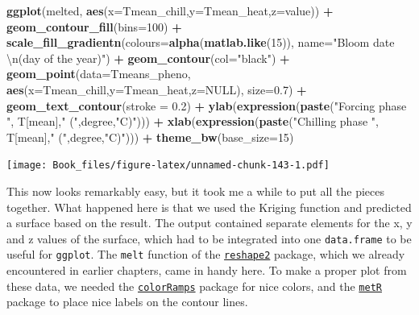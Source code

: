 \documentclass[
]{book}
\newenvironment{Shaded}{\begin{snugshade}}{\end{snugshade}}
\newcommand{\CharTok}[1]{\textcolor[rgb]{0.31,0.60,0.02}{#1}}
\newcommand{\DataTypeTok}[1]{\textcolor[rgb]{0.13,0.29,0.53}{#1}}
\newcommand{\DecValTok}[1]{\textcolor[rgb]{0.00,0.00,0.81}{#1}}
\newcommand{\FloatTok}[1]{\textcolor[rgb]{0.00,0.00,0.81}{#1}}
\newcommand{\KeywordTok}[1]{\textcolor[rgb]{0.13,0.29,0.53}{\textbf{#1}}}
\newcommand{\NormalTok}[1]{#1}
\newcommand{\OperatorTok}[1]{\textcolor[rgb]{0.81,0.36,0.00}{\textbf{#1}}}
\newcommand{\OtherTok}[1]{\textcolor[rgb]{0.56,0.35,0.01}{#1}}
\newcommand{\StringTok}[1]{\textcolor[rgb]{0.31,0.60,0.02}{#1}}
\begin{document}
\begin{Shaded}
\begin{Highlighting}[]
\KeywordTok{ggplot}\NormalTok{(melted,}
       \KeywordTok{aes}\NormalTok{(}\DataTypeTok{x=}\NormalTok{Tmean_chill,}\DataTypeTok{y=}\NormalTok{Tmean_heat,}\DataTypeTok{z=}\NormalTok{value)) }\OperatorTok{+}
\StringTok{  }\KeywordTok{geom_contour_fill}\NormalTok{(}\DataTypeTok{bins=}\DecValTok{100}\NormalTok{) }\OperatorTok{+}
\StringTok{  }\KeywordTok{scale_fill_gradientn}\NormalTok{(}\DataTypeTok{colours=}\KeywordTok{alpha}\NormalTok{(}\KeywordTok{matlab.like}\NormalTok{(}\DecValTok{15}\NormalTok{)),}
                       \DataTypeTok{name=}\StringTok{"Bloom date }\CharTok{\textbackslash{}n}\StringTok{(day of the year)"}\NormalTok{) }\OperatorTok{+}
\StringTok{  }\KeywordTok{geom_contour}\NormalTok{(}\DataTypeTok{col=}\StringTok{"black"}\NormalTok{)  }\OperatorTok{+}
\StringTok{  }\KeywordTok{geom_point}\NormalTok{(}\DataTypeTok{data=}\NormalTok{Tmeans_pheno,}
             \KeywordTok{aes}\NormalTok{(}\DataTypeTok{x=}\NormalTok{Tmean_chill,}\DataTypeTok{y=}\NormalTok{Tmean_heat,}\DataTypeTok{z=}\OtherTok{NULL}\NormalTok{),}
             \DataTypeTok{size=}\FloatTok{0.7}\NormalTok{) }\OperatorTok{+}
\StringTok{  }\KeywordTok{geom_text_contour}\NormalTok{(}\DataTypeTok{stroke =} \FloatTok{0.2}\NormalTok{) }\OperatorTok{+}
\StringTok{  }\KeywordTok{ylab}\NormalTok{(}\KeywordTok{expression}\NormalTok{(}\KeywordTok{paste}\NormalTok{(}\StringTok{"Forcing phase "}\NormalTok{, T[mean],}\StringTok{" ("}\NormalTok{,degree,}\StringTok{"C)"}\NormalTok{))) }\OperatorTok{+}
\StringTok{  }\KeywordTok{xlab}\NormalTok{(}\KeywordTok{expression}\NormalTok{(}\KeywordTok{paste}\NormalTok{(}\StringTok{"Chilling phase "}\NormalTok{, T[mean],}\StringTok{" ("}\NormalTok{,degree,}\StringTok{"C)"}\NormalTok{)))  }\OperatorTok{+}
\StringTok{  }\KeywordTok{theme_bw}\NormalTok{(}\DataTypeTok{base_size=}\DecValTok{15}\NormalTok{)}
\end{Highlighting}
\end{Shaded}

\texttt{[image: Book\_files/figure-latex/unnamed-chunk-143-1.pdf]}

This now looks remarkably easy, but it took me a while to put all the pieces together. What happened here is that we used the Kriging function and predicted a surface based on the result. The output contained separate elements for the x, y and z values of the surface, which had to be integrated into one \texttt{data.frame} to be useful for \texttt{ggplot}. The \texttt{melt} function of the \href{https://cran.r-project.org/web/packages/reshape2/index.html}{\texttt{reshape2}} package, which we already encountered in earlier chapters, came in handy here. To make a proper plot from these data, we needed the \href{https://cran.r-project.org/web/packages/colorRamps/index.html}{\texttt{colorRamps}} package for nice colors, and the \href{https://cran.r-project.org/web/packages/metR/index.html}{\texttt{metR}} package to place nice labels on the contour lines.
\end{document}
